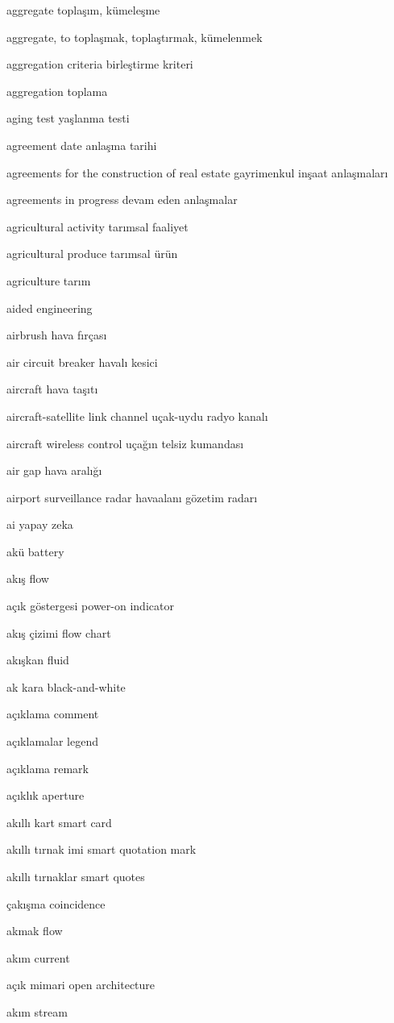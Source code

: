 \documentclass[12pt,fleqn]{article}\usepackage{../../common}
\begin{document}
aggregate toplaşım, kümeleşme

aggregate, to toplaşmak, toplaştırmak, kümelenmek

aggregation criteria birleştirme kriteri

aggregation toplama

aging test yaşlanma testi

agreement date anlaşma tarihi

agreements for the construction of real estate gayrimenkul inşaat anlaşmaları

agreements in progress devam eden anlaşmalar

agricultural activity tarımsal faaliyet

agricultural produce tarımsal ürün

agriculture tarım

aided engineering

airbrush hava fırçası

air circuit breaker havalı kesici

aircraft hava taşıtı

aircraft-satellite link channel uçak-uydu radyo kanalı

aircraft wireless control uçağın telsiz kumandası

air gap hava aralığı

airport surveillance radar havaalanı gözetim radarı

ai yapay zeka

akü battery

akış flow

açık göstergesi power-on indicator

akış çizimi flow chart

akışkan fluid

ak kara black-and-white

açıklama comment

açıklamalar legend

açıklama remark

açıklık aperture

akıllı kart smart card

akıllı tırnak imi smart quotation mark

akıllı tırnaklar smart quotes

çakışma coincidence

akmak flow

akım current

açık mimari open architecture

akım stream
\end{document}
